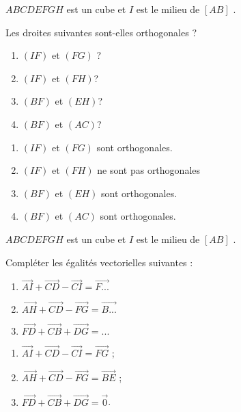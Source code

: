 \documentclass{cornouaille}
\begin{document}
\begin{exercice}
  $ABCDEFGH$ est un cube et $I$ est le milieu de $[AB]$ .

  Les droites suivantes sont-elles orthogonales ?
  \begin{enumerate}
  \item $(IF)$ et $(FG)$ ?
  \item $(IF)$ et $(FH)$?
  \item $(BF)$ et $(EH)$?
  \item $(BF)$ et $(AC)$?
  \end{enumerate}
\end{exercice}
\begin{solution}
  \begin{enumerate}
\item  $(IF)$ et $(FG)$ sont orthogonales.
\item  $(IF)$ et $(FH)$ ne sont pas orthogonales
\item  $(BF)$ et $(EH)$ sont orthogonales.
\item  $(BF)$ et $(AC)$ sont orthogonales.
\end{enumerate}
\end{solution}

\begin{exercice}
  $ABCDEFGH$ est un cube et $I$ est le milieu de $[AB]$ .

  Compléter les égalités vectorielles suivantes :
  \begin{enumerate}
  \item
    $\overrightarrow{AI}+\overrightarrow{CD}-\overrightarrow{CI}=\overrightarrow{F...}$
  \item
    $\overrightarrow{AH}+\overrightarrow{CD}-\overrightarrow{FG}=\overrightarrow{B...}$
  \item
    $\overrightarrow{FD}+\overrightarrow{CB}+\overrightarrow{DG} =...$
  \end{enumerate}
\end{exercice}
\begin{solution}
  \begin{enumerate}
\item  $\overrightarrow{AI}+\overrightarrow{CD}-\overrightarrow{CI}=\overrightarrow{FG}$ ;
\item $\overrightarrow{AH}+\overrightarrow{CD}-\overrightarrow{FG}=\overrightarrow{BE}$ ;
\item $\overrightarrow{FD}+\overrightarrow{CB}+\overrightarrow{DG} =\overrightarrow{0}$.
 \end{enumerate}
\end{solution}
\end{document}
